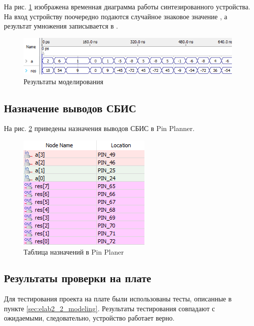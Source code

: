 На рис. \ref{fig:elab2_2_modeling} изображена временная диаграмма работы синтезированного устройства. На вход устройству поочередно подаются случайное знаковое значение , а результат умножения записывается в .

\begin{figure}[H]
\begin{center}
	\includegraphics[width=\textwidth]{elab2_2_modeling}
	\caption{Результаты моделирования}
	\label{fig:elab2_2_modeling}
\end{center}
\end{figure}

\subsection{Назначение выводов СБИС}

На рис. \ref{fig:elab2_2_pins} приведены назначения выводов СБИС в Pin Planner.

\begin{figure}[H]
\begin{center}
	\includegraphics{elab2_2_pins}
	\caption{Таблица назначений в Pin Planer}
	\label{fig:elab2_2_pins}
\end{center}
\end{figure}

\subsection{Результаты проверки на плате}

Для тестирования проекта на плате были использованы тесты, описанные в пункте \ref{sec:elab2_2_modeling}. Результаты тестирования совпадают с ожидаемыми, следовательно, устройство работает верно.


